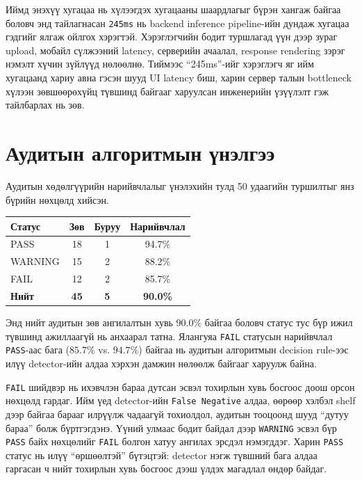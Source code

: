 Иймд энэхүү хугацаа нь хүлээгдэх хугацааны шаардлагыг бүрэн хангаж байгаа боловч энд тайлагнасан \texttt{245ms} нь backend inference pipeline-ийн дундаж хугацаа гэдгийг ялгаж ойлгох хэрэгтэй. Хэрэглэгчийн бодит туршлагад үүн дээр зураг upload, мобайл сүлжээний latency, серверийн ачаалал, response rendering зэрэг нэмэлт хүчин зүйлүүд нөлөөлнө. Тиймээс ``245ms''-ийг хэрэглэгч яг ийм хугацаанд хариу авна гэсэн шууд UI latency биш, харин сервер талын bottleneck хүлээн зөвшөөрөхүйц түвшинд байгааг харуулсан инженерийн үзүүлэлт гэж тайлбарлах нь зөв.

\section{Аудитын алгоритмын үнэлгээ}

Аудитын хөдөлгүүрийн нарийвчлалыг үнэлэхийн тулд 50 удаагийн туршилтыг янз бүрийн нөхцөлд хийсэн.

\begin{table}[H]
\centering
\caption{Аудитын үр дүнгийн задаргаа}
\label{tab:audit_results}
\begin{longtable}{|l|c|c|c|}
\hline
\textbf{Статус} & \textbf{Зөв} & \textbf{Буруу} & \textbf{Нарийвчлал} \\
\hline
PASS & 18 & 1 & 94.7\% \\
\hline
WARNING & 15 & 2 & 88.2\% \\
\hline
FAIL & 12 & 2 & 85.7\% \\
\hline
\textbf{Нийт} & \textbf{45} & \textbf{5} & \textbf{90.0\%} \\
\hline
\end{longtable}
\end{table}

Энд нийт аудитын зөв ангилалтын хувь \(90.0\%\) байгаа боловч статус тус бүр ижил түвшинд ажиллаагүй нь анхаарал татна. Ялангуяа \texttt{FAIL} статусын нарийвчлал \texttt{PASS}-аас бага (\(85.7\%\) vs. \(94.7\%\)) байгаа нь аудитын алгоритмын decision rule-ээс илүү detector-ийн алдаа хэрхэн дамжин нөлөөлж байгааг харуулж байна.

\texttt{FAIL} шийдвэр нь ихэвчлэн бараа дутсан эсвэл тохирлын хувь босгоос доош орсон нөхцөлд гардаг. Ийм үед detector-ийн \texttt{False Negative} алдаа, өөрөөр хэлбэл shelf дээр байгаа барааг илрүүлж чадаагүй тохиолдол, аудитын тооцоонд шууд ``дутуу бараа'' болж бүртгэгдэнэ. Үүний улмаас бодит байдал дээр \texttt{WARNING} эсвэл бүр \texttt{PASS} байх нөхцөлийг \texttt{FAIL} болгон хатуу ангилах эрсдэл нэмэгддэг. Харин \texttt{PASS} статус нь илүү ``өршөөлтэй'' бүтэцтэй: detector нэгж түвшний бага алдаа гаргасан ч нийт тохирлын хувь босгоос дээш үлдэх магадлал өндөр байдаг.

